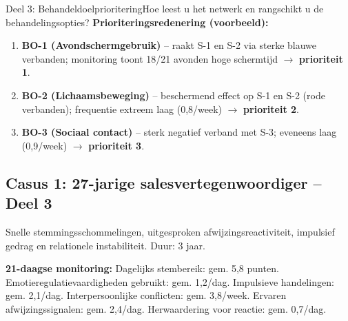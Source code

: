 \documentclass[11pt,a4paper]{article}
\begin{document}
\begin{voorbeeldbox}{Deel 3: Behandeldoelprioritering}{Hoe leest u het netwerk en rangschikt u de behandelingsopties?}
\medskip
\textbf{Prioriteringsredenering (voorbeeld):}
\begin{enumerate}[topsep=2pt,itemsep=1pt,label=\arabic*.]
\item \textbf{BO-1 (Avondschermgebruik)} -- raakt S-1 en S-2 via sterke blauwe verbanden;
monitoring toont 18/21 avonden hoge schermtijd $\rightarrow$ \textbf{prioriteit 1}.
\item \textbf{BO-2 (Lichaamsbeweging)} -- beschermend effect op S-1 en S-2 (rode verbanden);
frequentie extreem laag (0,8/week) $\rightarrow$ \textbf{prioriteit 2}.
\item \textbf{BO-3 (Sociaal contact)} -- sterk negatief verband met S-3; eveneens laag
(0,9/week) $\rightarrow$ \textbf{prioriteit 3}.
\end{enumerate}
\end{voorbeeldbox}

\vspace{0.5em}

\newpage
\subsection*{Casus 1: 27-jarige salesvertegenwoordiger -- Deel 3}

\begin{complaintbox}[title={Casus 1: 27-jarige salesvertegenwoordiger}]
\small Snelle stemmingsschommelingen, uitgesproken afwijzingsreactiviteit, impulsief gedrag en relationele instabiliteit. Duur: 3 jaar.
\end{complaintbox}

\begin{monitorbox}
\small\textbf{21-daagse monitoring:} Dagelijks stembereik: gem. 5,8 punten. Emotieregulatievaardigheden gebruikt: gem. 1,2/dag. Impulsieve handelingen: gem. 2,1/dag. Interpersoonlijke conflicten: gem. 3,8/week. Ervaren afwijzingssignalen: gem. 2,4/dag. Herwaardering voor reactie: gem. 0,7/dag.
\end{monitorbox}
\end{document}
